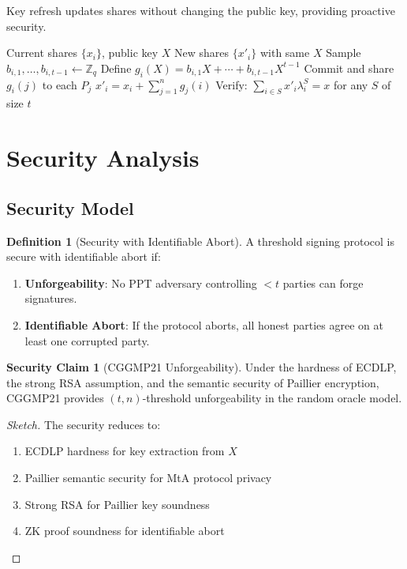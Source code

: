 \documentclass[11pt,a4paper]{article}
\theoremstyle{definition}
\newtheorem{definition}{Definition}
\newtheorem{security}{Security Claim}
\begin{document}
Key refresh updates shares without changing the public key, providing proactive security.

\begin{algorithm}
\caption{CGGMP21 Key Refresh}
\begin{algorithmic}[1]
\Require Current shares $\{x_i\}$, public key $X$
\Ensure New shares $\{x'_i\}$ with same $X$
    \State Sample $b_{i,1}, \ldots, b_{i,t-1} \leftarrow \mathbb{Z}_q$
    \State Define $g_i(X) = b_{i,1}X + \cdots + b_{i,t-1}X^{t-1}$ 
    \State Commit and share $g_i(j)$ to each $P_j$
\EndFor
{}
    \State $x'_i = x_i + \sum_{j=1}^{n} g_j(i)$
\EndFor
\State Verify: $\sum_{i \in S} x'_i \lambda_i^S = x$ for any $S$ of size $t$
\end{algorithmic}
\end{algorithm}

\section{Security Analysis}

\subsection{Security Model}

\begin{definition}[Security with Identifiable Abort]
A threshold signing protocol is secure with identifiable abort if:
\begin{enumerate}
\item \textbf{Unforgeability}: No PPT adversary controlling $< t$ parties can forge signatures.
\item \textbf{Identifiable Abort}: If the protocol aborts, all honest parties agree on at least one corrupted party.
\end{enumerate}
\end{definition}

\begin{security}[CGGMP21 Unforgeability]
Under the hardness of ECDLP, the strong RSA assumption, and the semantic security of Paillier encryption, CGGMP21 provides $(t, n)$-threshold unforgeability in the random oracle model.
\end{security}

\begin{proof}[Sketch]
The security reduces to:
\begin{enumerate}
\item ECDLP hardness for key extraction from $X$
\item Paillier semantic security for MtA protocol privacy
\item Strong RSA for Paillier key soundness
\item ZK proof soundness for identifiable abort
\end{enumerate}
\end{proof}
\end{document}

